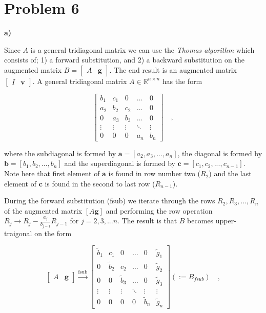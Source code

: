 \documentclass[final, 3p, times, 11.5pt]{article}
\begin{document}
\section*{Problem 6}

\textbf{a)}

Since $A$ is a general tridiagonal matrix we can use the \textit{Thomas algorithm} which consists of; 1) a forward substitution, and 2) a backward substitution on the augmented matrix $B = \begin{bmatrix}A & \mathbf{g} \end{bmatrix} $. The end result is an augmented matrix $\begin{bmatrix}I & \mathbf{v} \end{bmatrix}$. A general tridiagonal matrix $A \in \mathbb{R}^{n\times n}$ has the form 

$$
\begin{bmatrix}
b_1 & c_1 & 0 & \dots & 0 \\
a_2 & b_2 & c_2 & \dots & 0 \\
0   & a_3 & b_3 & \dots & 0 \\
\vdots & \vdots & \vdots & \ddots & \vdots \\
0  & 0 & 0 & a_n & b_n 
\end{bmatrix} \quad ,
$$

where the subdiagonal is formed by $\mathbf{a} = [a_2, a_3, ..., a_n]$, the diagonal is formed by $\mathbf{b} = [b_1, b_2, ..., b_n]$ and the superdiagonal is formed by $\mathbf{c} = [c_1, c_2, ..., c_{n-1}]$. Note here that first element of $\mathbf{a}$ is found in row number two ($R_2$) and the last element of $\mathbf{c}$ is found in the second to last row ($R_{n-1}$).

During the forward substitution (fsub) we iterate through the rows $R_2, R_3, ..., R_n$ of the augmented matrix $[A \mathbf{g}]$ and performing the row operation $R_j \to R_j - \frac{a_j}{b_{j-1}}R_{j-1}$ for $j=2, 3, ... n$. The result is that $B$ becomes upper-traigonal on the form 

$$
\begin{bmatrix}A & \mathbf{g} \end{bmatrix} \stackrel{\text{fsub}}{\to}
\left[
\begin{array}{ccccc|c}
\tilde{b}_1 & c_1 & 0 & \dots & 0 & \tilde{g}_1\\
0 & \tilde{b}_2 & c_2 & \dots & 0 & \tilde{g}_2\\
0 & 0 & \tilde{b}_3 & \dots & 0 & \tilde{g}_3 \\
\vdots & \vdots & \vdots & \ddots & \vdots & \vdots\\
0  & 0 & 0 & 0 & \tilde{b}_n & \tilde{g}_n
\end{array}
\right] (:= B_{fsub}) \quad ,
$$
\end{document}
